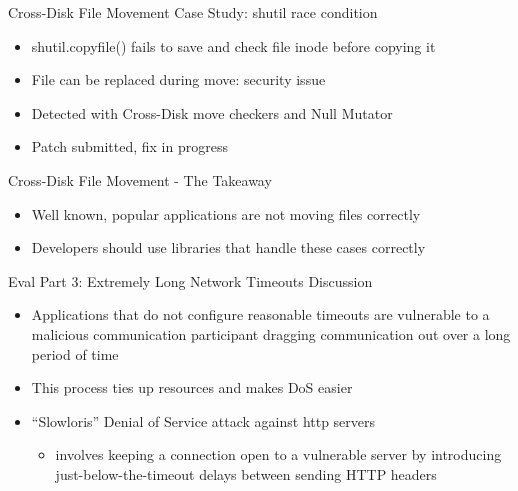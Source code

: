 \documentclass[pdf]{beamer}
\begin{document}
\begin{frame}{Cross-Disk File Movement Case Study: shutil race condition}
  \begin{itemize}
    \item{shutil.copyfile() fails to save and check file inode before
      copying it}
    \item{File can be replaced during move: security issue}
    \item{Detected with Cross-Disk move checkers and Null Mutator}
    \item{Patch submitted, fix in progress}
  \end{itemize}
\end{frame}


\begin{frame}{Cross-Disk File Movement - The Takeaway}
  \begin{itemize}
    \item{Well known, popular applications are not moving files correctly}
    \item{Developers should use libraries that handle these cases
        correctly}
  \end{itemize}
\end{frame}


\begin{frame}{Eval Part 3: Extremely Long Network Timeouts Discussion}



  \begin{itemize}
    \item{Applications that do not configure reasonable timeouts are vulnerable
      to a malicious communication participant dragging communication out over a
      long period of time}
    \item{This process ties up resources and makes DoS easier}
    \item{``Slowloris'' Denial of Service attack against http servers}
      \begin{itemize}
        \item{involves keeping a connection open to a vulnerable server by
          introducing just-below-the-timeout delays between sending HTTP headers}
      \end{itemize}
  \end{itemize}
\end{frame}
\end{document}
